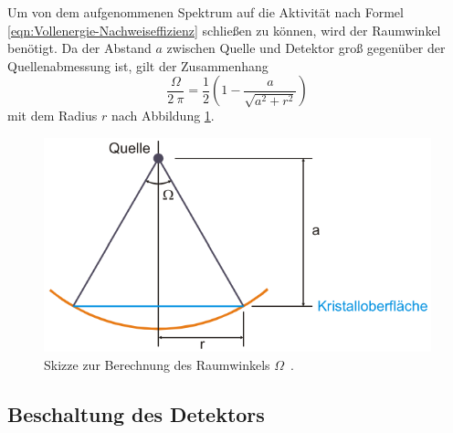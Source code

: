 Um von dem aufgenommenen Spektrum auf die Aktivität nach Formel \eqref{eqn:Vollenergie-Nachweiseffizienz}
schließen zu können, wird der Raumwinkel benötigt.
Da der Abstand $a$ zwischen Quelle und Detektor groß gegenüber der Quellenabmessung
ist, gilt der Zusammenhang
\begin{equation}
	\frac{\Omega}{2\:\pi} = \frac{1}{2} \left(1 - \frac{a}{\sqrt{a^2 + r^2}}\right)
	\label{eqn:Raumwinkel}
\end{equation}
mit dem Radius $r$ nach Abbildung \ref{fig:Raumwinkel}.
\begin{figure}
	\centering
	\includegraphics[width=.5\textwidth]{images/Raumwinkel.pdf}
	\caption{Skizze zur Berechnung des Raumwinkels $\Omega$~\cite[25]{anleitung}.}
	\label{fig:Raumwinkel}
\end{figure}

\subsection{Beschaltung des Detektors}
\label{sec:Schaltungen}

